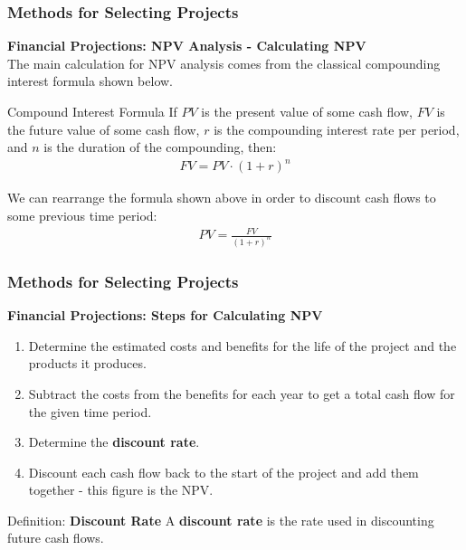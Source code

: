 \documentclass[aspectratio=169]{beamer}
\begin{document}
\begin{frame}
\frametitle{Methods for Selecting Projects}
\textbf{Financial Projections: NPV Analysis - Calculating NPV}\\
\vspace{0.5cm}
The main calculation for NPV analysis comes from the classical compounding interest formula shown below.
\vspace{0.2cm}
\begin{block}{Compound Interest Formula}
If $PV$ is the present value of some cash flow, $FV$ is the future value of some cash flow, $r$ is the compounding interest rate per period, and $n$ is the duration of the compounding, then:
\begin{align*}
FV = PV \cdot (1 + r)^n
\end{align*}
\end{block}
\vspace{0.2cm}
We can rearrange the formula shown above in order to discount cash flows to some previous time period:
\begin{align*}
PV = \frac{FV}{(1+r)^n}
\end{align*}
\end{frame}
\begin{frame}
\frametitle{Methods for Selecting Projects}
\textbf{Financial Projections: Steps for Calculating NPV}\\
\vspace{0.5cm}
\begin{enumerate}
\item Determine the estimated costs and benefits for the life of the project and the products it produces.
\item Subtract the costs from the benefits for each year to get a total cash flow for the given time period.
\item Determine the \textbf{discount rate}.
\item Discount each cash flow back to the start of the project and add them together - this figure is the NPV.
\end{enumerate}
\vspace{0.5cm}
\begin{block}{Definition: \textbf{Discount Rate}}
A \textbf{discount rate} is the rate used in discounting future cash flows.
\end{block}
\end{frame}
\end{document}
